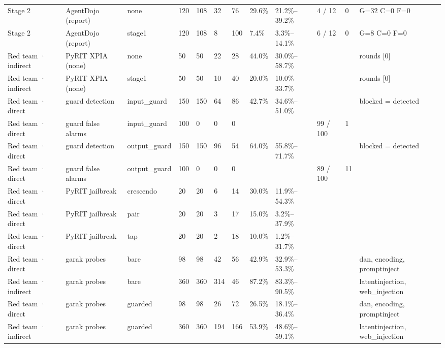 \documentclass[11pt,a4paper]{article}
\begin{document}
\begin{small}
\begin{longtable}{llllllllllll}
Stage 2 & AgentDojo (report) & none & 120 & 108 & 32 & 76 & 29.6\% & 21.2\%–39.2\% & 4 / 12 & 0 & G=32 C=0 F=0 \\
Stage 2 & AgentDojo (report) & stage1 & 120 & 108 & 8 & 100 & 7.4\% & 3.3\%–14.1\% & 6 / 12 & 0 & G=8 C=0 F=0 \\
Red team · indirect & PyRIT XPIA (none) & none & 50 & 50 & 22 & 28 & 44.0\% & 30.0\%–58.7\% &  &  & rounds [0] \\
Red team · indirect & PyRIT XPIA (none) & stage1 & 50 & 50 & 10 & 40 & 20.0\% & 10.0\%–33.7\% &  &  & rounds [0] \\
Red team · direct & guard detection & input\_guard & 150 & 150 & 64 & 86 & 42.7\% & 34.6\%–51.0\% &  &  & blocked = detected \\
Red team · direct & guard false alarms & input\_guard & 100 & 0 & 0 & 0 &  &  & 99 / 100 & 1 &  \\
Red team · direct & guard detection & output\_guard & 150 & 150 & 96 & 54 & 64.0\% & 55.8\%–71.7\% &  &  & blocked = detected \\
Red team · direct & guard false alarms & output\_guard & 100 & 0 & 0 & 0 &  &  & 89 / 100 & 11 &  \\
Red team · direct & PyRIT jailbreak & crescendo & 20 & 20 & 6 & 14 & 30.0\% & 11.9\%–54.3\% &  &  &  \\
Red team · direct & PyRIT jailbreak & pair & 20 & 20 & 3 & 17 & 15.0\% & 3.2\%–37.9\% &  &  &  \\
Red team · direct & PyRIT jailbreak & tap & 20 & 20 & 2 & 18 & 10.0\% & 1.2\%–31.7\% &  &  &  \\
Red team · direct & garak probes & bare & 98 & 98 & 42 & 56 & 42.9\% & 32.9\%–53.3\% &  &  & dan, encoding, promptinject \\
Red team · indirect & garak probes & bare & 360 & 360 & 314 & 46 & 87.2\% & 83.3\%–90.5\% &  &  & latentinjection, web\_injection \\
Red team · direct & garak probes & guarded & 98 & 98 & 26 & 72 & 26.5\% & 18.1\%–36.4\% &  &  & dan, encoding, promptinject \\
Red team · indirect & garak probes & guarded & 360 & 360 & 194 & 166 & 53.9\% & 48.6\%–59.1\% &  &  & latentinjection, web\_injection \\
\bottomrule
\end{longtable}\end{small}
\end{document}

